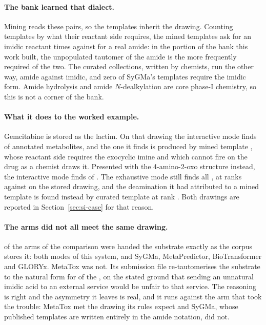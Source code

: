 \documentclass[journal=jcisd8,manuscript=suppinfo,layout=onecolumn]{achemso}
\begin{document}
\paragraph{The bank learned that dialect.} Mining reads these pairs, so the templates inherit the
drawing. Counting templates by what their reactant side requires, the mined templates ask for an
imidic reactant \numDialectBankMinedimidic{} times against \numDialectBankMinedamide{} for a real
amide: in the portion of the bank this work built, the unpopulated tautomer of the amide is the more
frequently required of the two. The curated collections, written by chemists, run the other way,
\numDialectBankCuratedamide{} amide against \numDialectBankCuratedimidic{} imidic, and zero of
SyGMa's \numSygmaRules{} templates require the imidic form. Amide hydrolysis and amide
$N$-dealkylation are core phase-I chemistry, so this is not a corner of the bank.

\paragraph{What it does to the worked example.} Gemcitabine is stored as the lactim. On that
drawing the interactive mode finds \numCaseInterFound{} of \numCaseReferences{} annotated
metabolites, and the one it finds is produced by mined template \numCaseInterRulehit{}, whose
reactant side requires the exocyclic imine and which cannot fire on the drug as a chemist draws
it. Presented with the 4-amino-2-oxo structure instead, the interactive mode finds
\numCaseInterdrawnFound{} of \numCaseReferences{}. The exhaustive mode still finds all
\numCaseExhdrawnFound{}, at ranks \numCaseExhdrawnRanks{} against \numCaseExhRanks{} on the stored
drawing, and the deamination it had attributed to a mined template is found instead by curated
template \numCaseExhdrawnDeamrule{} at rank \numCaseExhdrawnDeamrank{}. Both drawings are reported
in Section~\ref{sec:si-case} for that reason.

\paragraph{The arms did not all meet the same drawing.} \numChemDrawnstoredWord{} of the
\numChemArmsWord{} arms of the comparison were handed the substrate exactly as the corpus
stores it: both modes of this system, and SyGMa, MetaPredictor, BioTransformer and GLORYx.
MetaTox was not. Its submission file re-tautomerises the substrate to the
natural form for \numDialectMetatoxretaut{} of the \numDialectMetatoxn{}, on the stated ground that
sending an unnatural
imidic acid to an external service would be unfair to that service. The reasoning is right and the
asymmetry it leaves is real, and it runs against the arm that took the trouble: MetaTox met the
drawing its rules expect and SyGMa, whose published templates are written entirely in the amide
notation, did not.
\end{document}
